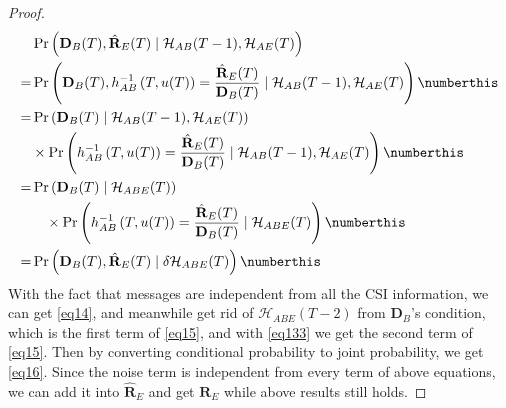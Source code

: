 \begin{proof}
\begin{subequations}
    \begin{align*}
        &\Pr\left(\mathbf{D}_B(T),\hat{\mathbf{R}}_E(T) \mid \mathcal{H}_{AB}(T-1),\mathcal{H}_{AE}(T)\right)\\
        = &\Pr\left(\mathbf{D}_B(T),h_{AB}^{-1}\left(T,u(T)\right)=\frac{\hat{\mathbf{R}}_E(T)}{\mathbf{D}_B(T)}\mid \mathcal{H}_{AB}(T-1), \mathcal{H}_{AE}(T)\right) \numberthis \label{eq13}\\
        = &\Pr\left(\mathbf{D}_B(T)\mid \mathcal{H}_{AB}(T-1), \mathcal{H}_{AE}(T)\right) \\
        &\times \Pr\left(h_{AB}^{-1}\left(T,u(T)\right)=\frac{\hat{\mathbf{R}}_E(T)}{\mathbf{D}_B(T)}\mid \mathcal{H}_{AB}(T-1), \mathcal{H}_{AE}(T)\right) \numberthis \label{eq14} \\
        = &\Pr\left(\mathbf{D}_B(T)\mid \mathcal{H}_{ABE}(T)\right) \\
        & \ \ \ \times \Pr\left(h_{AB}^{-1}\left(T,u(T)\right)=\frac{\hat{\mathbf{R}}_E(T)}{\mathbf{D}_B(T)}\mid \mathcal{H}_{ABE}(T)\right) \numberthis \label{eq15} \\
        = & \Pr\left(\mathbf{D}_B(T),\hat{\mathbf{R}}_E(T) \mid \delta\mathcal{H}_{ABE}(T)\right) \numberthis \label{eq16}
    \end{align*}
\end{subequations}
With the fact that messages are independent from all the CSI information, we can get \eqref{eq14}, and meanwhile get rid of $\mathcal{H}_{ABE}(T-2)$ from $\mathbf{D}_B$'s condition, which is the first term of \eqref{eq15}, and with \eqref{eq133} we get the second term of \eqref{eq15}. Then by converting conditional probability to joint probability, we get \eqref{eq16}. Since the noise term is independent from every term of above equations, we can add it into $\hat{\mathbf{R}}_E$ and get $\mathbf{R}_E$ while above results still holds. 


\end{proof}
